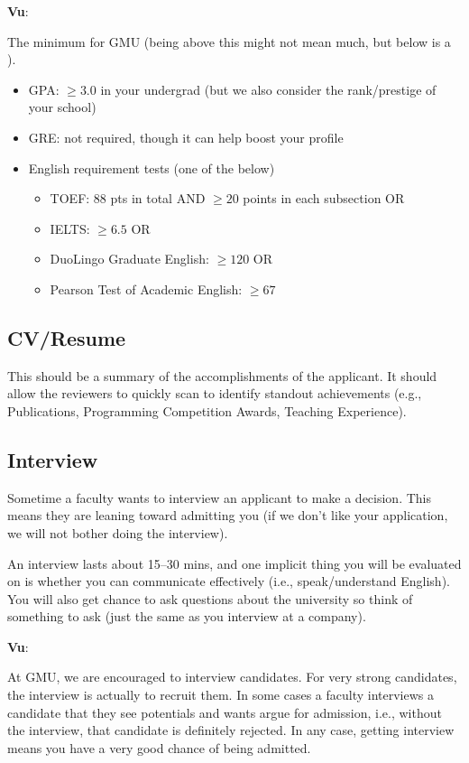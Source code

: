 \documentclass[11pt]{article}
\newenvironment{commentbox}[1][]{
\small
    \begin{cbox}
    \textbf{#1}: 
 }{
   \end{cbox}
}
\newcommand{\red}[1]{{\color{red}{#1}}}
\begin{document}
\begin{commentbox}[Vu]
The minimum for GMU (being above this might not mean much, but below is a \red{red flag}).
\begin{itemize}
\item GPA: $\ge 3.0$ in your undergrad (but we also consider the rank/prestige of your school)
\item GRE: not required, though it can help boost your profile
\item English requirement tests (one of the below)
  \begin{itemize}    
  \item TOEF: 88 pts in total AND $\ge 20$ points in each subsection OR
  \item IELTS: $\ge 6.5$ OR
  \item DuoLingo Graduate English: $\ge 120$ OR 
  \item Pearson Test of Academic English: $\ge 67$
  \end{itemize}  
\end{itemize}
\end{commentbox}


\subsection{CV/Resume}
This should be a summary of the accomplishments of the applicant.  It should allow the reviewers to quickly scan to identify standout achievements (e.g., Publications, Programming Competition Awards, Teaching Experience).

\subsection{Interview}

Sometime a faculty wants to interview an applicant to make a decision. This means they are leaning toward admitting you (if we don't like your application, we will not bother doing the interview).

An interview lasts about 15--30 mins, and one implicit thing you will be evaluated on is whether you can communicate effectively (i.e., speak/understand English).  You will also get chance to ask questions about the university so think of something to ask (just the same as you interview at a company).

\begin{commentbox}[Vu]
At GMU, we are encouraged to interview candidates. For very strong candidates, the interview is actually to recruit them.  In some cases a faculty interviews a candidate that they see potentials and wants argue for admission, i.e., without the interview, that candidate is definitely rejected. In any case, getting interview means you have a very good chance of being admitted.
\end{commentbox}
\end{document}
